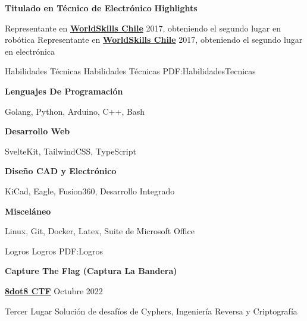 \documentclass[letterpaper,yyyy,draft]{simpleresumecv}
\begin{document}
\begin{Body}
{    \Gap
    \BulletItem
    \textbf{Titulado en Técnico de Electrónico}
    \BigGap
    \BulletItem
    \textbf{Highlights}
    \begin{Detail}
    \SubBulletItem
    Representante en \href{https://worldskills.org/}{\textbf{WorldSkills Chile}} 2017, obteniendo el segundo lugar en robótica
    \SubBulletItem
    Representante en \href{https://worldskills.org/}{\textbf{WorldSkills Chile}} 2017, obteniendo el segundo lugar en electrónica
    \end{Detail}
}


\Section
{Habilidades Técnicas}
{Habilidades Técnicas}
{PDF:HabilidadesTecnicas}
{
    {
        \Gap
        \BulletItem
        \textbf{Lenguajes De Programación}
        \hfill
        \begin{Detail}
        \Item
        Golang, Python, Arduino, C++, Bash
        \end{Detail}
    }

    {
        \BigGap
        \BulletItem
        \textbf{Desarrollo Web}
        \hfill
        \begin{Detail}
        \Item
        SvelteKit, TailwindCSS, TypeScript
        \end{Detail}
    }

    {
        \BigGap
        \BulletItem
        \textbf{Diseño CAD y Electrónico}
        \hfill
        \begin{Detail}
        \Item
        KiCad, Eagle, Fusion360, Desarrollo Integrado
        \end{Detail}
    }

    {
        \BigGap
        \BulletItem
        \textbf{Misceláneo}
        \hfill
        \begin{Detail}
        \Item
        Linux, Git, Docker, Latex, Suite de Microsoft Office
        \end{Detail}
    }
}

\newpage


\Section
{Logros}
{Logros}
{PDF:Logros}
{
    \Gap
    \BulletItem
    \textbf{Capture The Flag (Captura La Bandera)}
    {
        \Gap
        \SubBulletItem
        \href{https://8dot8.org}{\textbf{8dot8 CTF}}
        \hfill
        Octubre 2022
        \begin{Detail}
        \SubItem
        Tercer Lugar\newline
        Solución de desafíos de \newline Cyphers, Ingeniería Reversa y Criptografía
        \end{Detail}
    }

}
\end{Body}
\end{document}
